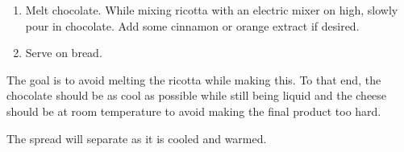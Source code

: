 
\begin{ingredients}
\end{ingredients}


\begin{recipe}
  \begin{enumerate}

  \item Melt chocolate.  While mixing ricotta with an electric mixer
    on high, slowly pour in chocolate.  Add some cinnamon or orange
    extract if desired.

    \item Serve on bread.

  \end{enumerate}

  The goal is to avoid melting the ricotta while making this.  To that
  end, the chocolate should be as cool as possible while still being
  liquid and the cheese should be at room temperature to avoid making
  the final product too hard.

  The spread will separate as it is cooled and warmed.

\end{recipe}

